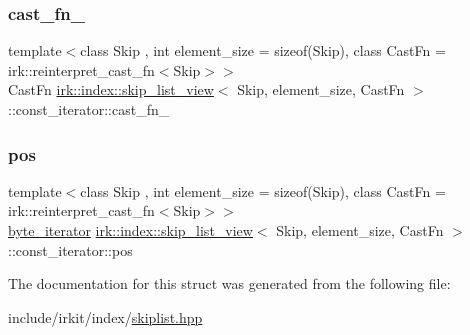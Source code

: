 \subsubsection{\texorpdfstring{cast\+\_\+fn\+\_\+}{cast\_fn\_}}
{\footnotesize\ttfamily template$<$class Skip , int element\+\_\+size = sizeof(\+Skip), class Cast\+Fn  = irk\+::reinterpret\+\_\+cast\+\_\+fn$<$\+Skip$>$$>$ \\
Cast\+Fn \mbox{\hyperlink{classirk_1_1index_1_1skip__list__view}{irk\+::index\+::skip\+\_\+list\+\_\+view}}$<$ Skip, element\+\_\+size, Cast\+Fn $>$\+::const\+\_\+iterator\+::cast\+\_\+fn\+\_\+}

\mbox{\label{structirk_1_1index_1_1skip__list__view_1_1const__iterator_ae8edc3733ccabb25cbcdc1cdf8b72a9a}} 
\subsubsection{\texorpdfstring{pos}{pos}}
{\footnotesize\ttfamily template$<$class Skip , int element\+\_\+size = sizeof(\+Skip), class Cast\+Fn  = irk\+::reinterpret\+\_\+cast\+\_\+fn$<$\+Skip$>$$>$ \\
\mbox{\hyperlink{namespaceirk_1_1index_a4089fad8418d09bec3dd2a7ff91d1cea}{byte\+\_\+iterator}} \mbox{\hyperlink{classirk_1_1index_1_1skip__list__view}{irk\+::index\+::skip\+\_\+list\+\_\+view}}$<$ Skip, element\+\_\+size, Cast\+Fn $>$\+::const\+\_\+iterator\+::pos}



The documentation for this struct was generated from the following file\+:\begin{DoxyCompactItemize}
\item 
include/irkit/index/\mbox{\hyperlink{skiplist_8hpp}{skiplist.\+hpp}}\end{DoxyCompactItemize}
